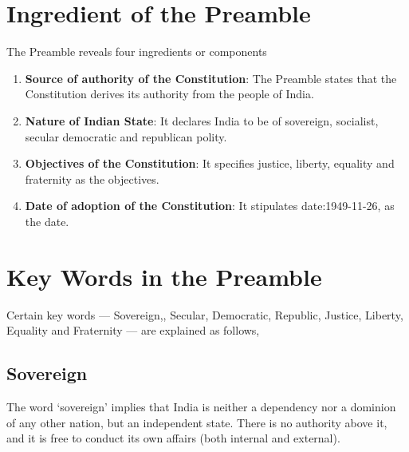 \begin{multicol}{2}
\section{Ingredient of the Preamble}

The Preamble reveals four ingredients or components

\begin{enumerate}
  \item \textbf{Source of authority of the Constitution}: The Preamble states that the Constitution derives its authority from the people of India.
  \item \textbf{Nature of Indian State}: It declares India to be of sovereign, socialist, secular democratic and republican polity.
  \item \textbf{Objectives of the Constitution}: It specifies justice, liberty, equality and fraternity as the objectives.
  \item \textbf{Date of adoption of the Constitution}: It stipulates \gls{date:1949-11-26}, as the date.
\end{enumerate}


\section{Key Words in the Preamble}

Certain key words — Sovereign,, Secular, Democratic, Republic, Justice, Liberty, Equality and Fraternity — are explained as follows,

\subsection{Sovereign}

The word `sovereign' implies that India is neither a dependency nor a dominion of any other nation, but an independent state. There is no authority above it, and it is free to conduct its own affairs (both internal and external).


\end{multicol}
